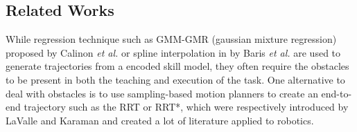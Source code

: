 \documentclass[letterpaper, 10 pt, conference]{ieeeconf}  %
\begin{document}
\subsection{Related Works}
While regression technique such as GMM-GMR (gaussian mixture regression) proposed by Calinon \textit{et al.} or spline interpolation in \cite{refKeyframe1} by Baris \textit{et al.} are used to generate trajectories from a encoded skill model, they often require the obstacles to be present in both the teaching and execution of the task. 
One alternative to deal with obstacles is to use sampling-based motion planners to create an end-to-end trajectory such as the RRT or RRT*, which were respectively introduced by LaValle \cite{Lavalle98rapidly-exploringrandom} and  Karaman \cite{KaramanRRTStar} and created a lot of literature applied to robotics.
\end{document}
